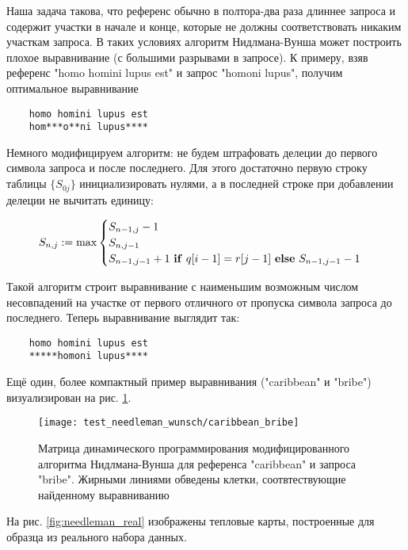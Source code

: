 \documentclass{main.tex}[subfiles]
\begin{document}
Наша задача такова, что референс обычно в полтора-два раза длиннее запроса и содержит участки в начале и конце, которые не должны соответствовать никаким участкам запроса.
В таких условиях алгоритм Нидлмана-Вунша может построить плохое выравнивание (с большими разрывами в запросе).
К примеру, взяв референс "homo homini lupus est"\hspace{0pt} и запрос "homoni lupus", получим оптимальное выравнивание

\begin{verbatim}
    homo homini lupus est
    hom***o**ni lupus****
\end{verbatim}

Немного модифицируем алгоритм: не будем штрафовать делеции до первого символа запроса и после последнего.
Для этого достаточно первую строку таблицы $ \{ S_{0j} \} $ инициализировать нулями, а в последней строке при добавлении делеции не вычитать единицу:

\[ S_{n,j} := \max \begin{cases}
    S_{n-1,j} - 1 \\
    S_{n,j-1} \\
    S_{n-1,j-1} + 1 \text{ \textbf{if} } q[i-1] = r[j-1] \text{ \textbf{else} } S_{n-1,j-1} - 1
\end{cases} \]

Такой алгоритм строит выравнивание с наименьшим возможным числом несовпадений на участке от первого отличного от пропуска символа запроса до последнего. %
Теперь выравнивание выглядит так:

\begin{verbatim}
    homo homini lupus est
    *****homoni lupus****
\end{verbatim}

Ещё один, более компактный пример выравнивания ("caribbean"\hspace{0pt} и "bribe") визуализирован на рис. \ref{fig:caribbean_bribe}.

\begin{figure}[H]
    \centering
    \texttt{[image: test\_needleman\_wunsch/caribbean\_bribe]}
    \caption{Матрица динамического программирования модифицированного алгоритма Нидлмана-Вунша для референса "caribbean"\hspace{0pt} и запроса "bribe". Жирными линиями обведены клетки, соотвтествующие найденному выравниванию }
    \label{fig:caribbean_bribe}
\end{figure}

На рис. \ref{fig:needleman_real} изображены тепловые карты, построенные для образца из реального набора данных. %
\end{document}
